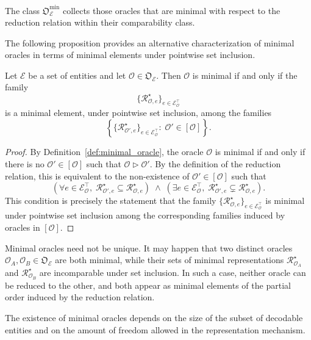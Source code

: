 The class $\mathfrak{O}_{\mathcal{E}}^{\min}$ collects those oracles that are minimal with respect to the reduction relation within their comparability class.

The following proposition provides an alternative characterization of minimal oracles in terms of minimal elements under pointwise set inclusion.

\begin{proposition}
\label{prop:characterization_minimality}
Let $\mathcal{E}$ be a set of entities and let $\mathcal{O} \in \mathfrak{O}_{\mathcal{E}}$. Then $\mathcal{O}$ is minimal if and only if the family
\[
\bigl\{\mathcal{R}^\star_{\mathcal{O}, e}\bigr\}_{e \in \mathcal{E}^\top_{\mathcal{O}}}
\]
is a minimal element, under pointwise set inclusion, among the families
\[
\left\{
\bigl\{\mathcal{R}^\star_{\mathcal{O}', e}\bigr\}_{e \in \mathcal{E}^\top_{\mathcal{O}}}
:\;
\mathcal{O}' \in [\mathcal{O}]
\right\}.
\]
\end{proposition}

\begin{proof}
By Definition~\ref{def:minimal_oracle}, the oracle $\mathcal{O}$ is minimal if and only if there is no $\mathcal{O}' \in [\mathcal{O}]$ such that $\mathcal{O} \triangleright \mathcal{O}'$. By the definition of the reduction relation, this is equivalent to the non-existence of $\mathcal{O}' \in [\mathcal{O}]$ such that
\[
\left(
\forall e \in \mathcal{E}^\top_{\mathcal{O}},\;
\mathcal{R}^\star_{\mathcal{O}', e} \subseteq \mathcal{R}^\star_{\mathcal{O}, e}
\right)
\;\wedge\;
\left(
\exists e \in \mathcal{E}^\top_{\mathcal{O}},\;
\mathcal{R}^\star_{\mathcal{O}', e} \subsetneq \mathcal{R}^\star_{\mathcal{O}, e}
\right).
\]
This condition is precisely the statement that the family $\{\mathcal{R}^\star_{\mathcal{O}, e}\}_{e \in \mathcal{E}^\top_{\mathcal{O}}}$ is minimal under pointwise set inclusion among the corresponding families induced by oracles in $[\mathcal{O}]$.
\end{proof}

Minimal oracles need not be unique. It may happen that two distinct oracles $\mathcal{O}_A, \mathcal{O}_B \in \mathfrak{O}_{\mathcal{E}}$ are both minimal, while their sets of minimal representations $\mathcal{R}^\star_{\mathcal{O}_A}$ and $\mathcal{R}^\star_{\mathcal{O}_B}$ are incomparable under set inclusion. In such a case, neither oracle can be reduced to the other, and both appear as minimal elements of the partial order induced by the reduction relation.

The existence of minimal oracles depends on the size of the subset of decodable entities and on the amount of freedom allowed in the representation mechanism.


